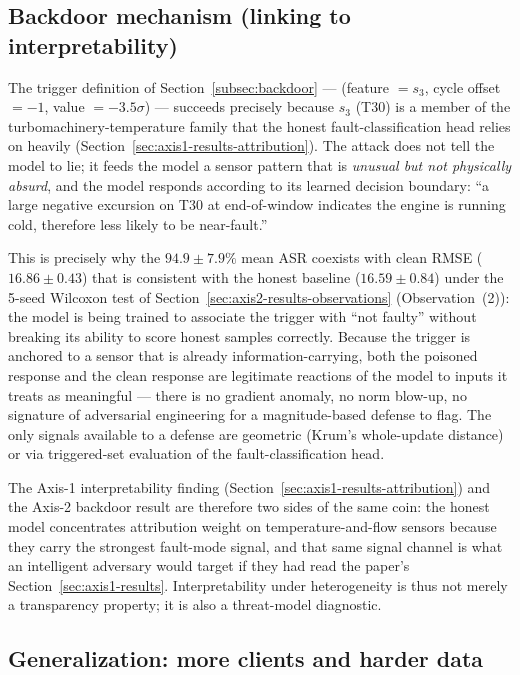\documentclass[a4paper,fleqn,doubleblind]{cas-sc}
\begin{document}
\subsection{Backdoor mechanism (linking to interpretability)}
\label{sec:axis2-results-mechanism}

The trigger definition of Section~\ref{subsec:backdoor} ---
(feature $= s_3$, cycle offset $= -1$, value $= -3.5\sigma$) ---
succeeds precisely because $s_3$ (T30) is a member of the
turbomachinery-temperature family that the honest
fault-classification head relies on heavily
(Section~\ref{sec:axis1-results-attribution}). The attack does not
tell the model to lie; it feeds the model a sensor pattern that is
\emph{unusual but not physically absurd}, and the model responds
according to its learned decision boundary: ``a large negative
excursion on T30 at end-of-window indicates the engine is running
cold, therefore less likely to be near-fault.''

This is precisely why the $94.9 \pm 7.9\%$ mean ASR coexists with
clean RMSE ($16.86 \pm 0.43$) that is consistent with the honest
baseline ($16.59 \pm 0.84$) under the 5-seed Wilcoxon test of
Section~\ref{sec:axis2-results-observations} (Observation~(2)):
the model is being trained to associate the trigger with ``not
faulty'' without breaking its ability to score honest samples
correctly. Because the trigger
is anchored to a sensor that is already information-carrying, both
the poisoned response and the clean response are legitimate
reactions of the model to inputs it treats as meaningful --- there
is no gradient anomaly, no norm blow-up, no signature of adversarial
engineering for a magnitude-based defense to flag. The only signals
available to a defense are geometric (Krum's whole-update distance)
or via triggered-set evaluation of the fault-classification head.

The Axis-1 interpretability finding
(Section~\ref{sec:axis1-results-attribution}) and the Axis-2 backdoor
result are therefore two sides of the same coin: the honest model
concentrates attribution weight on temperature-and-flow sensors
because they carry the strongest fault-mode signal, and that same
signal channel is what an intelligent adversary would target if
they had read the paper's Section~\ref{sec:axis1-results}.
Interpretability under heterogeneity is thus not merely a
transparency property; it is also a threat-model diagnostic.

\subsection{Generalization: more clients and harder data}
\label{sec:axis2-results-gen}
\end{document}
